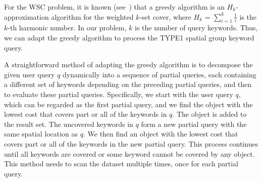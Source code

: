 \documentclass{sig-alternate}
\begin{document}
For the WSC problem, it is known (see~\cite{setcover}) that a greedy
algorithm is an $H_k$-approximation algorithm for the weighted
$k$-set cover, where $H_k$ = $\sum_{i =1}^{k} \frac{1}{i}$ is the
$k$-th harmonic number. In our problem, $k$ is the number of query
keywords.
%
Thus, we can adapt the greedy algorithm to process the \textsc{TYPE1}
spatial group keyword query.

A straightforward method of adapting the greedy algorithm is to
decompose the given user query $q$ dynamically into a
sequence of partial queries, each containing a different set of
keywords depending on the preceding partial queries, and then to
evaluate these partial queries.
%
Specifically, we start with the user query $q$, which can be regarded
as the first partial query, and we find the object with the lowest
cost that covers part or all of the keywords in $q$. The object is
added to the result set. The uncovered keywords in $q$ form a new
partial query with the same spatial location as $q$.  We then
find an object with the lowest cost that covers
part or all of the keywords in the new partial query. This process
continues until all keywords are covered or some keyword cannot be
covered by any object. This method needs to scan the dataset multiple
times, once for each partial query.

%
\end{document}
